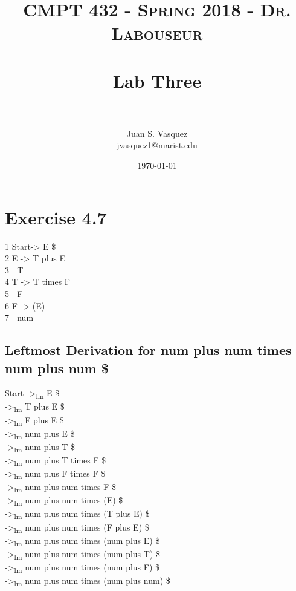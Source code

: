 \documentclass[letterpaper, 10pt,DIV=13]{scrartcl}
\title{	
   \normalfont \normalsize 
   \textsc{CMPT 432 - Spring 2018 - Dr. Labouseur} \\[10pt] %
   \horrule{0.5pt} \\[0.25cm] 	%
   \huge Lab Three \\     	    %
   \horrule{0.5pt} \\[0.25cm] 	%
}
\author{Juan S. Vasquez \\ \normalsize jvasquez1@marist.edu}
\date{\normalsize\today} 	%
\numberwithin{equation}{section} %
\numberwithin{figure}{section} %
\numberwithin{table}{section} %
\begin{document}
\maketitle %

\section{Exercise 4.7}

1 Start\hspace{0.3cm}-> E \$  \\
2 E \hspace{0.6cm}   -> T plus E  \\
3   \hspace{1cm}     | T          \\
4 T  \hspace{0.6cm}   -> T times F \\
5    \hspace{1cm}    | F           \\
6 F  \hspace{0.6cm}   -> (E)       \\
7    \hspace{1cm}    | num

\subsection{Leftmost Derivation for num plus num times num plus num \$}

Start ->\textsubscript{lm} E \$ \\
->\textsubscript{lm} T plus E \$ \\
->\textsubscript{lm} F plus E \$ \\
->\textsubscript{lm} num plus E \$ \\
->\textsubscript{lm} num plus T \$ \\
->\textsubscript{lm} num plus T times F \$ \\
->\textsubscript{lm} num plus F times F \$ \\
->\textsubscript{lm} num plus num times F \$ \\
->\textsubscript{lm} num plus num times (E) \$ \\
->\textsubscript{lm} num plus num times (T plus E) \$ \\
->\textsubscript{lm} num plus num times (F plus E) \$ \\
->\textsubscript{lm} num plus num times (num plus E) \$ \\
->\textsubscript{lm} num plus num times (num plus T) \$ \\
->\textsubscript{lm} num plus num times (num plus F) \$ \\
->\textsubscript{lm} num plus num times (num plus num) \$
\end{document}

